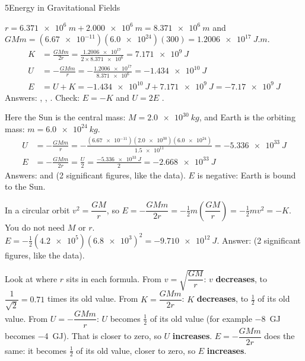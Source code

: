 \begin{chapteranswers}{5}{Energy in Gravitational Fields}
  \item $r = \qty{6.371e6}{m} + \qty{2.000e6}{m} = \qty{8.371e6}{m}$ and
        $GMm = (\num{6.67e-11})(\num{6.0e24})(300) = \qty{1.2006e17}{J.m}$.
        \begin{align*}
          K &= \frac{GMm}{2r} = \frac{\num{1.2006e17}}{2 \times \num{8.371e6}} = \qty{7.171e9}{J}\\
          U &= -\frac{GMm}{r} = -\frac{\num{1.2006e17}}{\num{8.371e6}} = \qty{-1.434e10}{J}\\
          E &= U + K = \qty{-1.434e10}{J} + \qty{7.171e9}{J} = \qty{-7.17e9}{J}
        \end{align*}
        Answers: , ,
        . Check: $E = -K$ and $U = 2E$ \cmark.
  \item Here the Sun is the central mass: $M = \qty{2.0e30}{kg}$, and Earth is
        the orbiting mass: $m = \qty{6.0e24}{kg}$.
        \begin{align*}
          U &= -\frac{GMm}{r} = -\frac{(\num{6.67e-11})(\num{2.0e30})(\num{6.0e24})}{\num{1.5e11}}
             = \qty{-5.336e33}{J}\\
          E &= -\frac{GMm}{2r} = \frac{U}{2} = \frac{\qty{-5.336e33}{J}}{2} = \qty{-2.668e33}{J}
        \end{align*}
        Answers:  and 
        (2 significant figures, like the data). $E$ is negative: Earth is
        bound to the Sun.
  \item In a circular orbit $v^2 = \dfrac{GM}{r}$, so
        $E = -\dfrac{GMm}{2r} = -\tfrac{1}{2}m\left(\dfrac{GM}{r}\right) = -\tfrac{1}{2}mv^2 = -K$.
        You do not need $M$ or $r$.
        $E = -\tfrac{1}{2}(\num{4.2e5})(\num{6.8e3})^2 = \qty{-9.710e12}{J}$.
        Answer:  (2 significant figures, like the data).
  \item Look at where $r$ sits in each formula.
        From $v = \sqrt{\dfrac{GM}{r}}$: $v$ \textbf{decreases}, to
        $\dfrac{1}{\sqrt{2}} = 0.71$ times its old value.
        From $K = \dfrac{GMm}{2r}$: $K$ \textbf{decreases}, to $\tfrac{1}{2}$ of
        its old value.
        From $U = -\dfrac{GMm}{r}$: $U$ becomes $\tfrac{1}{2}$ of its old value
        (for example \qty{-8}{GJ} becomes \qty{-4}{GJ}). That is closer to zero,
        so $U$ \textbf{increases}.
        $E = -\dfrac{GMm}{2r}$ does the same: it becomes $\tfrac{1}{2}$ of its
        old value, closer to zero, so $E$ \textbf{increases}.

\end{chapteranswers}
